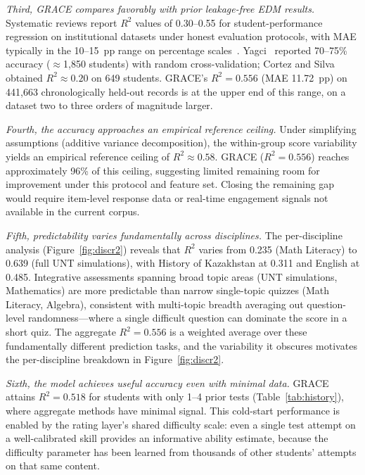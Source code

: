 \documentclass[11pt]{article}
\begin{document}
\textit{Third, GRACE compares favorably with prior leakage-free EDM results.}\quad
Systematic reviews report $R^{2}$ values of 0.30--0.55 for student-performance
regression on institutional datasets under honest evaluation protocols, with MAE
typically in the 10--15~pp range on percentage scales~\cite{romero2020,hellas2018}.
Yagci~\cite{yagci2022} reported 70--75\% accuracy ($\approx$1,850 students) with
random cross-validation; Cortez and Silva~\cite{cortez2008} obtained $R^{2} \approx 0.20$
on 649 students.
GRACE's $R^{2} = 0.556$ (MAE 11.72~pp) on 441{,}663 chronologically held-out records
is at the upper end of this range, on a dataset two to three orders of magnitude larger.

\textit{Fourth, the accuracy approaches an empirical reference ceiling.}\quad
Under simplifying assumptions (additive variance decomposition), the within-group
score variability yields an empirical reference ceiling of $R^{2} \approx 0.58$.
GRACE ($R^{2}=0.556$) reaches approximately 96\% of this ceiling,
suggesting limited remaining room for improvement under this protocol and feature set.
Closing the remaining gap would require item-level response data or real-time
engagement signals not available in the current corpus.

\textit{Fifth, predictability varies fundamentally across disciplines.}\quad
The per-discipline analysis (Figure~\ref{fig:discr2}) reveals that $R^{2}$
varies from 0.235 (Math Literacy) to 0.639 (full UNT simulations), with
History of Kazakhstan at 0.311 and English at 0.485.
Integrative assessments spanning broad topic areas (UNT simulations, Mathematics)
are more predictable than narrow single-topic quizzes (Math Literacy, Algebra),
consistent with multi-topic breadth averaging out question-level randomness---where a
single difficult question can dominate the score in a short quiz.
The aggregate $R^{2} = 0.556$ is a weighted average over these fundamentally different
prediction tasks, and the variability it obscures motivates the per-discipline breakdown
in Figure~\ref{fig:discr2}.

\textit{Sixth, the model achieves useful accuracy even with minimal data.}\quad
GRACE attains $R^{2} = 0.518$ for students with only 1--4 prior tests
(Table~\ref{tab:history}), where aggregate methods have minimal signal.
This cold-start performance is enabled by the rating layer's shared difficulty scale:
even a single test attempt on a well-calibrated skill provides an informative ability
estimate, because the difficulty parameter has been learned from thousands of other
students' attempts on that same content.
\end{document}
